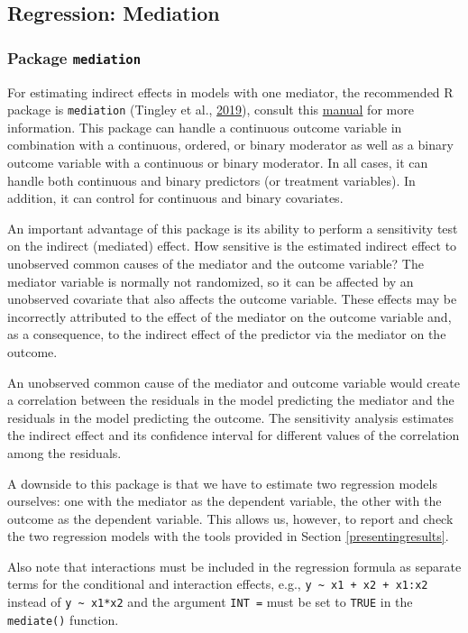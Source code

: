 \documentclass[doc,floatsintext]{apa6}
\begin{document}
\subsection{Regression: Mediation}\label{regression-mediation}

\subsubsection{\texorpdfstring{Package
\texttt{mediation}}{Package mediation}}\label{package-mediation}

For estimating indirect effects in models with one mediator, the
recommended R package is \texttt{mediation} (Tingley et al.,
\protect\hyperlink{ref-R-mediation}{2019}), consult this
\href{https://web.mit.edu/teppei/www/research/mediationR.pdf}{manual}
for more information. This package can handle a continuous outcome
variable in combination with a continuous, ordered, or binary moderator
as well as a binary outcome variable with a continuous or binary
moderator. In all cases, it can handle both continuous and binary
predictors (or treatment variables). In addition, it can control for
continuous and binary covariates.

An important advantage of this package is its ability to perform a
sensitivity test on the indirect (mediated) effect. How sensitive is the
estimated indirect effect to unobserved common causes of the mediator
and the outcome variable? The mediator variable is normally not
randomized, so it can be affected by an unobserved covariate that also
affects the outcome variable. These effects may be incorrectly
attributed to the effect of the mediator on the outcome variable and, as
a consequence, to the indirect effect of the predictor via the mediator
on the outcome.

An unobserved common cause of the mediator and outcome variable would
create a correlation between the residuals in the model predicting the
mediator and the residuals in the model predicting the outcome. The
sensitivity analysis estimates the indirect effect and its confidence
interval for different values of the correlation among the residuals.

A downside to this package is that we have to estimate two regression
models ourselves: one with the mediator as the dependent variable, the
other with the outcome as the dependent variable. This allows us,
however, to report and check the two regression models with the tools
provided in Section \ref{presentingresults}.

Also note that interactions must be included in the regression formula
as separate terms for the conditional and interaction effects, e.g.,
\texttt{y\ \textasciitilde{}\ x1\ +\ x2\ +\ x1:x2} instead of
\texttt{y\ \textasciitilde{}\ x1*x2} and the argument \texttt{INT\ =}
must be set to \texttt{TRUE} in the \texttt{mediate()} function.
\end{document}
